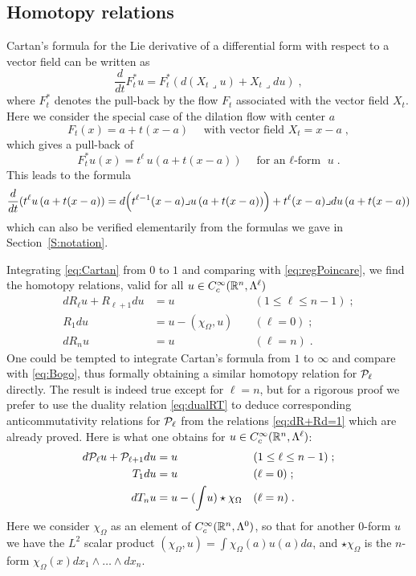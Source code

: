 \documentclass[10pt,a4paper]{article}
\begin{document}
\subsection{Homotopy relations}

Cartan's formula for the Lie derivative of a differential form with respect to a vector field can be written as
$$
  \frac{d}{dt}F^*_t u = F^*_t \left(d(X_t\lrcorner u) + X_t\lrcorner du\right)\;,
$$
where $F^*_t$ denotes the pull-back by the flow $F_t$ associated with the vector field $X_t$. Here we consider the special case of the dilation flow with center $a$
$$
  F_t(x) = a+t(x-a) \quad\text{ with vector field } X_t=x-a\;,
$$
which gives a pull-back of
$$
  F^*_t u(x) = t^\ell \,u\left(a+t(x-a)\right) \quad \text{for an $\ell$-form } u \;.
$$
This leads to the formula
\begin{equation}
\label{eq:Cartan}
 \frac{d}{dt}(t^\ell u\left(a+t(x-a)\right) =
    d\Bigl(t^{\ell-1}(x-a)\lrcorner u\left(a+t(x-a)\right)\Bigr) +
    t^{\ell}(x-a)\lrcorner du\left(a+t(x-a)\right)
\end{equation}
which can also be verified elementarily from the formulas we gave in Section~\ref{S:notation}.

Integrating \eqref{eq:Cartan} from $0$ to $1$ and comparing with \eqref{eq:regPoincare}, 
we find the homotopy relations, valid for all $u\in{C^\infty_c}({\mathbb R}^n,\Lambda^\ell)$ 
\begin{equation}
\begin{aligned}
\label{eq:dR+Rd=1}
 dR_{\ell} u + R_{\ell+1} du &= u\; &&(1\le\ell\le n-1)\;;\\
 R_1 du &= u - \left(\chi_{\Omega},u\right)\; &&(\ell=0)\;;\\
 dR_nu &=u &&(\ell=n)\;.
\end{aligned}
\end{equation}
One could be tempted to integrate Cartan's formula from $1$ to $\infty$ and compare with \eqref{eq:Bogo}, thus formally obtaining a similar homotopy relation for ${\mathcal P}_{\ell}$ directly. The result is indeed true except for $\ell=n$, but for a rigorous proof we prefer to use the duality relation \eqref{eq:dualRT} to deduce corresponding anticommutativity relations for ${\mathcal P}_{\ell}$ from the relations \eqref{eq:dR+Rd=1} which are already proved. Here is what one obtains for $u\in{C^\infty_c}({\mathbb R}^n,\Lambda^\ell)$:
\begin{equation}
\begin{aligned}
\label{eq:dT+Td=1}
  d{\mathcal P}_{\ell} u + {\mathcal P}_{\ell+1} du &= u\; &&(1\le\ell\le n-1)\;;\\
  T_1 du &= u \; &&(\ell=0)\;;\\
 dT_n u &=u - (\int\! u)\star\chi_{\Omega}&&(\ell=n)\;.
\end{aligned}
\end{equation}
Here we consider $\chi_{\Omega}$ as an element of ${C^\infty_c}({\mathbb R}^n,\Lambda^0)$, so that for another $0$-form $u$ we have the $L^2$ scalar product $\left(\chi_{\Omega},u\right)=\int\chi_{\Omega}(a)u(a)da$, and $\star\chi_{\Omega}$ is the $n$-form $\chi_{\Omega}(x)dx_1\wedge\dots\wedge dx_n$. 
\end{document}

